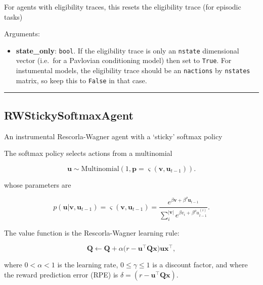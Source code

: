 For agents with eligibility traces, this resets the eligibility trace
(for episodic tasks)

Arguments:

\begin{itemize}
\tightlist
\item
  \textbf{state\_only}: \texttt{bool}. If the eligibility trace is only
  an \texttt{nstate} dimensional vector (i.e.~for a Pavlovian
  conditioning model) then set to \texttt{True}. For instumental models,
  the eligibility trace should be an \texttt{nactions} by
  \texttt{nstates} matrix, so keep this to \texttt{False} in that case.
\end{itemize}

\begin{center}\rule{0.5\linewidth}{\linethickness}\end{center}

\subsection{RWStickySoftmaxAgent}\label{rwstickysoftmaxagent}

\begin{Shaded}
\begin{Highlighting}[]
\end{Highlighting}
\end{Shaded}

An instrumental Rescorla-Wagner agent with a `sticky' softmax policy

The softmax policy selects actions from a multinomial

\[
\mathbf u \sim \mathrm{Multinomial}(1, \mathbf p=\varsigma(\mathbf v, \mathbf u_{t-1})).
\]

whose parameters are

\[
p(\mathbf u|\mathbf v, \mathbf u_{t-1}) = \varsigma(\mathbf v, \mathbf u_{t-1}) = \frac{e^{\beta \mathbf v + \beta^\rho \mathbf u_{t-1}}}{\sum_{i}^{|\mathbf v|} e^{\beta v_i + \beta^\rho u_{t-1}^{(i)}}}.
\]

The value function is the Rescorla-Wagner learning rule:

\[
\mathbf Q \gets \mathbf Q + \alpha \big(r - \mathbf u^\top \mathbf Q \mathbf x \big) \mathbf u \mathbf x^\top,
\]

where \(0 < \alpha < 1\) is the learning rate, \(0 \leq \gamma \leq 1\)
is a discount factor, and where the reward prediction error (RPE) is
\(\delta = (r - \mathbf u^\top \mathbf Q \mathbf x)\).

